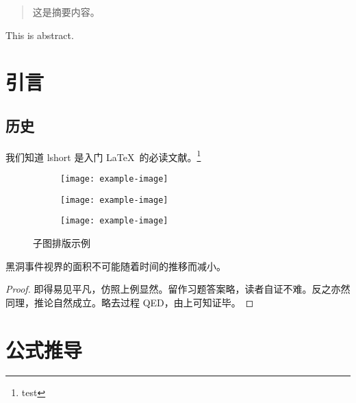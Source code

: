 \documentclass[final,newenv]{ncuthesis}
\begin{document}
\maketitle
\frontmatter
\makedecaut
\begin{abstract}
这是摘要内容。
\end{abstract}
\begin{abstract*}
This is abstract.
\end{abstract*}
\tableofcontents
\mainmatter
\chapter{引言}
\section{历史}
我们知道 lshort\cite{lshortcn} 是入门 \LaTeX\ 的必读文献。\footnote{test}

\begin{figure}[htb]
\centering
\begin{subfigure}{.45\textwidth}
\centering
\texttt{[image: example-image]}
\label{fig:subfigexp-a}
\end{subfigure}
\begin{subfigure}{.45\textwidth}
\centering
\texttt{[image: example-image]}
\label{fig:subfigexp-b}
\end{subfigure}
\begin{subfigure}{.45\textwidth}
\centering
\texttt{[image: example-image]}
\label{fig:subfigexp-c}
\end{subfigure}
\caption{子图排版示例}
\label{fig:subfig}
\end{figure}

\begin{law}[黑洞面积定律]
黑洞事件视界的面积不可能随着时间的推移而减小。
\end{law}
\begin{proof}
即得易见平凡，仿照上例显然。留作习题答案略，读者自证不难。反之亦然同理，推论自然成立。略去过程 QED，由上可知证毕。
\end{proof}
\appendix
\chapter{公式推导}
\end{document}
